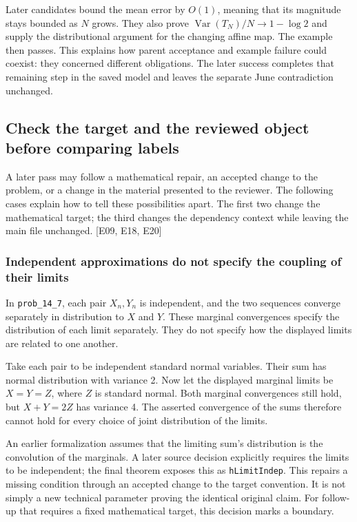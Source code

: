 Later candidates bound the mean error by $O(1)$, meaning that its magnitude stays bounded as $N$ grows. They also prove $\operatorname{Var}(T_N)/N\to1-\log2$ and supply the distributional argument for the changing affine map. The example then passes. This explains how parent acceptance and example failure could coexist: they concerned different obligations. The later success completes that remaining step in the saved model and leaves the separate June contradiction unchanged.

\subsection[Check the target and the reviewed object before comparing labels]{\texorpdfstring{\protect\hypertarget{l4}{}Check the target and the reviewed object before comparing labels}{Check the target and the reviewed object before comparing labels}}
A later pass may follow a mathematical repair, an accepted change to the problem, or a change in the material presented to the reviewer. The following cases explain how to tell these possibilities apart. The first two change the mathematical target; the third changes the dependency context while leaving the main file unchanged. [E09, E18, E20]

\subsubsection[Independent approximations do not specify the coupling of their limits]{\texorpdfstring{\protect\hypertarget{l4-1}{}Independent approximations do not specify the coupling of their limits}{Independent approximations do not specify the coupling of their limits}}
In \nolinkurl{prob_14_7}, each pair $X_n,Y_n$ is independent, and the two sequences converge separately in distribution to $X$ and $Y$. These marginal convergences specify the distribution of each limit separately. They do not specify how the displayed limits are related to one another.

Take each pair to be independent standard normal variables. Their sum has normal distribution with variance 2. Now let the displayed marginal limits be $X=Y=Z$, where $Z$ is standard normal. Both marginal convergences still hold, but $X+Y=2Z$ has variance 4. The asserted convergence of the sums therefore cannot hold for every choice of joint distribution of the limits.

An earlier formalization assumes that the limiting sum's distribution is the convolution of the marginals. A later source decision explicitly requires the limits to be independent; the final theorem exposes this as \nolinkurl{hLimitIndep}. This repairs a missing condition through an accepted change to the target convention. It is not simply a new technical parameter proving the identical original claim. For follow-up that requires a fixed mathematical target, this decision marks a boundary.

